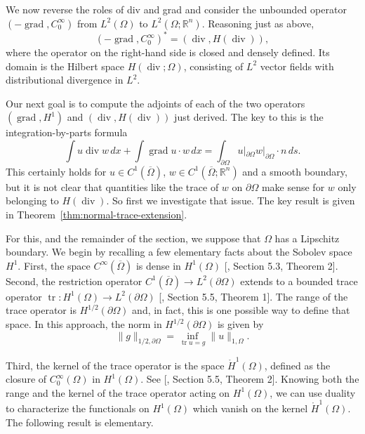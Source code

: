 {We now reverse the roles of div and grad and consider the unbounded operator $(-\operatorname{grad},C_0^\infty)$ from $L^2(\Omega)$ to $L^2(\Omega;\mathbb R^n)$. Reasoning just as above,}
\[
(-\operatorname{grad},C_0^\infty)^*=(\operatorname{div},H(\operatorname{div})),
\]
{where the operator on the right-hand side is closed and densely defined. Its domain is the Hilbert space $H(\operatorname{div};\Omega)$, consisting of $L^2$ vector fields with distributional divergence in $L^2$.}

{Our next goal is to compute the adjoints of each of the two operators $(\operatorname{grad},H^1)$ and $(\operatorname{div},H(\operatorname{div}))$ just derived. The key to this is the integration-by-parts formula}
\begin{equation}\label{eq:grad-div-classical-green}
\int u\operatorname{div}w\,dx+\int\operatorname{grad}u\cdot w\,dx=\int_{\partial\Omega}u|_{\partial\Omega}w|_{\partial\Omega}\cdot n\,ds.
\end{equation}
{This certainly holds for $u\in C^1(\overline\Omega)$, $w\in C^1(\overline\Omega;\mathbb R^n)$ and a smooth boundary, but it is not clear that quantities like the trace of $w$ on $\partial\Omega$ make sense for $w$ only belonging to $H(\operatorname{div})$. So first we investigate that issue. The key result is given in Theorem~\ref{thm:normal-trace-extension}.}

{For this, and the remainder of the section, we suppose that $\Omega$ has a Lipschitz boundary. We begin by recalling a few elementary facts about the Sobolev space $H^1$. First, the space $C^\infty(\overline\Omega)$ is dense in $H^1(\Omega)$ [, Section 5.3, Theorem 2]. Second, the restriction operator $C^1(\overline\Omega)\to L^2(\partial\Omega)$ extends to a bounded trace operator $\operatorname{tr}:H^1(\Omega)\to L^2(\partial\Omega)$ [, Section 5.5, Theorem 1]. The range of the trace operator is $H^{1/2}(\partial\Omega)$ and, in fact, this is one possible way to define that space. In this approach, the norm in $H^{1/2}(\partial\Omega)$ is given by}
\begin{equation}\label{eq:trace-quotient-norm}
\|g\|_{1/2,\partial\Omega}=\inf_{\operatorname{tr}u=g}\|u\|_{1,\Omega}.
\end{equation}

{Third, the kernel of the trace operator is the space $\mathring H^1(\Omega)$, defined as the closure of $C_0^\infty(\Omega)$ in $H^1(\Omega)$. See [, Section 5.5, Theorem 2]. Knowing both the range and the kernel of the trace operator acting on $H^1(\Omega)$, we can use duality to characterize the functionals on $H^1(\Omega)$ which vanish on the kernel $\mathring H^1(\Omega)$. The following result is elementary.}

